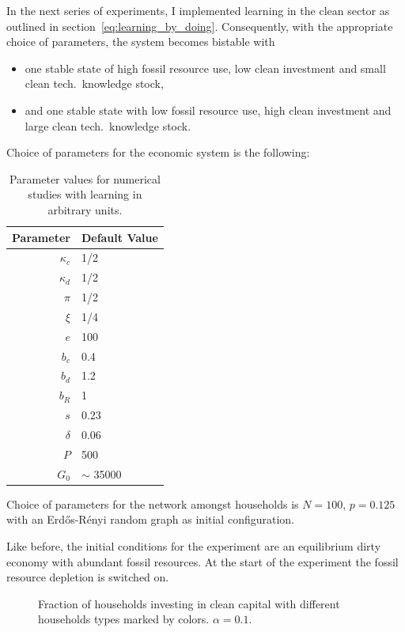 In the next series of experiments, I implemented learning in the clean sector as outlined in section~\ref{eq:learning_by_doing}.
Consequently, with the appropriate choice of parameters, the system becomes bistable with 
\begin{itemize}
	\item one stable state of high fossil resource use, low clean investment and small clean tech.\ knowledge stock,
	\item and one stable state with low fossil resource use, high clean investment and large clean tech.\ knowledge stock.
\end{itemize}
Choice of parameters for the economic system is the following:

\begin{table}[t] 
	\centering
	\begin{tabular}{r|l}
		Parameter & Default Value \\\hline
		$\kappa_c$ & 1/2 \\
		$\kappa_d$ & 1/2 \\
		$\pi$ & 1/2 \\
		$\xi$ & 1/4 \\
		$e$ & 100 \\
		$b_c$ & 0.4 \\
		$b_d$ & 1.2 \\
		$b_R$ & 1 \\
		$s$ & 0.23 \\
		$\delta $ & 0.06 \\
		$P$ & 500 \\
		$G_0$ & $\sim$ 35000 \\
	\end{tabular}
	\caption{Parameter values for numerical studies with learning in arbitrary units.}
	\label{tab:learning_parameter_values}
\end{table}

Choice of parameters for the network amongst households is $N=100$, $p=0.125$ with an Erd\H{o}s-R\'enyi random graph as initial configuration. 

Like before, the initial conditions for the experiment are an equilibrium dirty economy with abundant fossil resources. At the start of the experiment the fossil resource depletion is switched on.\

\begin{figure}[t]
	\centering
	\caption{Fraction of households investing in clean capital with different households types marked by colors. $\alpha=0.1$.}
	\label{fig:learning_decisions0o1}
\end{figure}

